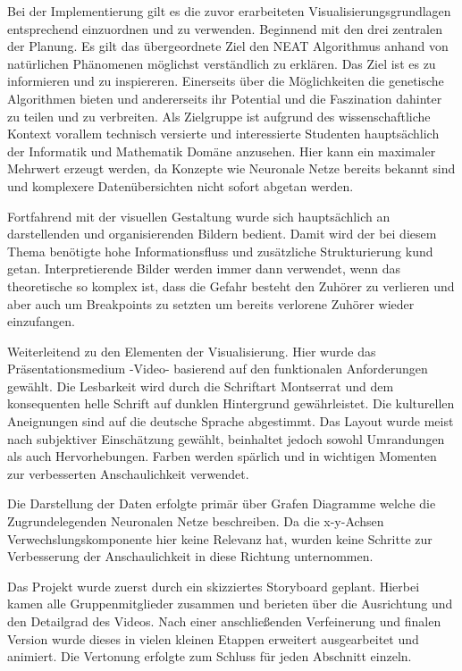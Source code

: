 Bei der Implementierung gilt es die zuvor erarbeiteten Visualisierungsgrundlagen entsprechend einzuordnen und zu verwenden. Beginnend mit den drei zentralen der Planung. Es gilt das übergeordnete Ziel den NEAT Algorithmus anhand von natürlichen Phänomenen möglichst verständlich zu erklären. Das Ziel ist es zu informieren und zu inspiereren. Einerseits über die Möglichkeiten die genetische Algorithmen bieten und andererseits ihr Potential und die Faszination dahinter zu teilen und zu verbreiten. Als Zielgruppe ist aufgrund des wissenschaftliche Kontext vorallem technisch versierte und interessierte Studenten hauptsächlich der Informatik und Mathematik Domäne anzusehen. Hier kann ein maximaler Mehrwert erzeugt werden, da Konzepte wie Neuronale Netze bereits bekannt sind und komplexere Datenübersichten nicht sofort abgetan werden. 

Fortfahrend mit der visuellen Gestaltung wurde sich hauptsächlich an darstellenden und organisierenden Bildern bedient. Damit wird der bei diesem Thema benötigte hohe Informationsfluss und zusätzliche Strukturierung kund getan. Interpretierende Bilder werden immer dann verwendet, wenn das theoretische so komplex ist, dass die Gefahr besteht den Zuhörer zu verlieren und aber auch um Breakpoints zu setzten um bereits verlorene Zuhörer wieder einzufangen. 

Weiterleitend zu den Elementen der Visualisierung. Hier wurde das Präsentationsmedium -Video- basierend auf den funktionalen Anforderungen gewählt. Die Lesbarkeit wird durch die Schriftart Montserrat und dem konsequenten helle Schrift auf dunklen Hintergrund gewährleistet. Die kulturellen Aneignungen sind auf die deutsche Sprache abgestimmt. Das Layout wurde meist nach subjektiver Einschätzung gewählt, beinhaltet jedoch sowohl Umrandungen als auch Hervorhebungen. Farben werden spärlich und in wichtigen Momenten zur verbesserten Anschaulichkeit verwendet. 

Die Darstellung der Daten erfolgte primär über Grafen Diagramme welche die Zugrundelegenden Neuronalen Netze beschreiben. Da die x-y-Achsen Verwechslungskomponente hier keine Relevanz hat, wurden keine Schritte zur Verbesserung der Anschaulichkeit in diese Richtung unternommen. 

Das Projekt wurde zuerst durch ein skizziertes Storyboard geplant. Hierbei kamen alle Gruppenmitglieder zusammen und berieten über die Ausrichtung und den Detailgrad des Videos. Nach einer anschließenden Verfeinerung und finalen Version wurde dieses in vielen kleinen Etappen erweitert ausgearbeitet und animiert. Die Vertonung erfolgte zum Schluss für jeden Abschnitt einzeln. 

 
